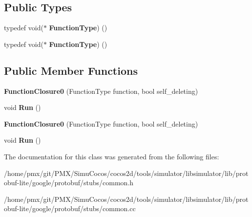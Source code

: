 \subsection*{Public Types}
\begin{DoxyCompactItemize}
\item 
\mbox{\label{classgoogle_1_1protobuf_1_1internal_1_1FunctionClosure0_ac11db5d198521c060e2bb17a674559fd}} 
typedef void($\ast$ {\bfseries Function\+Type}) ()
\item 
\mbox{\label{classgoogle_1_1protobuf_1_1internal_1_1FunctionClosure0_ac11db5d198521c060e2bb17a674559fd}} 
typedef void($\ast$ {\bfseries Function\+Type}) ()
\end{DoxyCompactItemize}
\subsection*{Public Member Functions}
\begin{DoxyCompactItemize}
\item 
\mbox{\label{classgoogle_1_1protobuf_1_1internal_1_1FunctionClosure0_aa3a48cecf26fd59b4d945a7f20340a23}} 
{\bfseries Function\+Closure0} (Function\+Type function, bool self\+\_\+deleting)
\item 
\mbox{\label{classgoogle_1_1protobuf_1_1internal_1_1FunctionClosure0_afadbade0e25344d2e736993c06be7a9e}} 
void {\bfseries Run} ()
\item 
\mbox{\label{classgoogle_1_1protobuf_1_1internal_1_1FunctionClosure0_aa3a48cecf26fd59b4d945a7f20340a23}} 
{\bfseries Function\+Closure0} (Function\+Type function, bool self\+\_\+deleting)
\item 
\mbox{\label{classgoogle_1_1protobuf_1_1internal_1_1FunctionClosure0_afadbade0e25344d2e736993c06be7a9e}} 
void {\bfseries Run} ()
\end{DoxyCompactItemize}


The documentation for this class was generated from the following files\+:\begin{DoxyCompactItemize}
\item 
/home/pmx/git/\+P\+M\+X/\+Simu\+Cocos/cocos2d/tools/simulator/libsimulator/lib/protobuf-\/lite/google/protobuf/stubs/common.\+h\item 
/home/pmx/git/\+P\+M\+X/\+Simu\+Cocos/cocos2d/tools/simulator/libsimulator/lib/protobuf-\/lite/google/protobuf/stubs/common.\+cc\end{DoxyCompactItemize}
